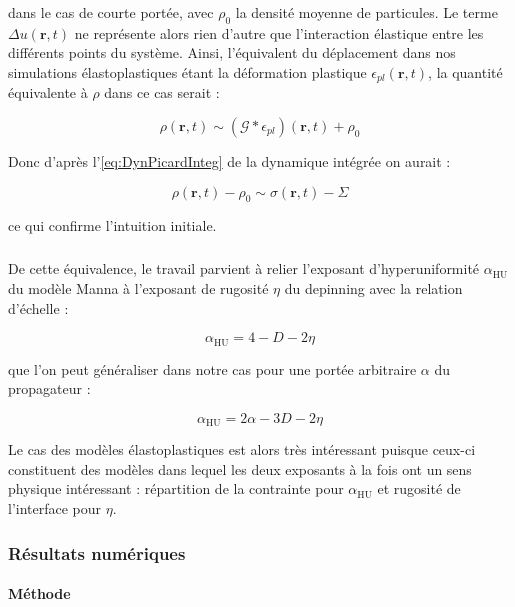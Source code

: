\noindent dans le cas de courte portée, avec $\rho_0$ la densité moyenne de particules. Le terme $\Delta u(\mathbf{r},t)$ ne représente alors rien d'autre que l'interaction élastique entre les différents points du système. Ainsi, l'équivalent du déplacement dans nos simulations élastoplastiques étant la déformation plastique $
\epsilon_{pl}(\mathbf{r},t)$, la quantité équivalente à $\rho$ dans ce cas serait :

\begin{equation}
	\rho (\mathbf{r},t) \sim \left(\mathcal{G}\ast\epsilon_{pl}\right)(\mathbf{r},t)+ \rho_0
\end{equation}

\noindent Donc d'après l'\autoref{eq:DynPicardInteg} de la dynamique intégrée on aurait :

\begin{equation}
	\rho (\mathbf{r},t) - \rho_0 \sim \sigma (\mathbf{r},t)- \Sigma
\end{equation}

\noindent ce qui confirme l'intuition initiale.

\subparagraph{}De cette équivalence, le travail \cite{wiese_hyperuniformity_2024} parvient à relier l'exposant d'hyperuniformité $\alpha_\text{HU}$ du modèle Manna à l'exposant de rugosité $\eta$ du depinning avec la relation d'échelle :

\begin{equation}
	\alpha_\text{HU} = 4 - D - 2\eta
\end{equation}

\noindent que l'on peut généraliser dans notre cas pour une portée arbitraire $\alpha$ du propagateur :

\begin{equation}
	\alpha_\text{HU} = 2\alpha - 3D - 2\eta
	\label{eq:scalingHULP}
\end{equation}

\noindent Le cas des modèles élastoplastiques est alors très intéressant puisque ceux-ci constituent des modèles dans lequel les deux exposants à la fois ont un sens physique intéressant :  répartition de la contrainte pour $\alpha_\text{HU}$ et rugosité de l'interface pour $\eta$.

\subsubsection{Résultats numériques}

\label{sec:HUEPM}

\paragraph{Méthode}

